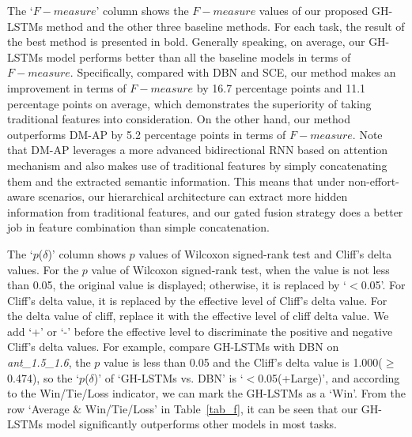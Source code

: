 \documentclass[journal]{IEEEtran}
\begin{document}
The `$F-measure$' column shows the $F-measure$ values of our proposed GH-LSTMs method and the other three baseline methods. For each task, the result of the best method is presented in bold. Generally speaking, on average, our GH-LSTMs model performs better than all the baseline models in terms of $F-measure$. Specifically, compared with DBN and SCE, our method makes an improvement in terms of $F-measure$ by 16.7 percentage points and 11.1 percentage points on average, which demonstrates the superiority of taking traditional features into consideration. On the other hand, our method outperforms DM-AP by 5.2 percentage points in terms of $F-measure$. Note that DM-AP leverages a more advanced bidirectional RNN based on attention mechanism and also makes use of traditional features by simply concatenating them and the extracted semantic information. This means that under non-effort-aware scenarios, our hierarchical architecture can extract more hidden information from traditional features, and our gated fusion strategy does a better job in feature combination than simple concatenation.


The `$p$($\delta$)' column shows $p$ values of Wilcoxon signed-rank test and Cliff's delta values. For the $p$ value of Wilcoxon signed-rank test, when the value is not less than 0.05, the original value is displayed; otherwise, it is replaced by `$<$0.05'. For Cliff's delta value, it is replaced by the effective level of Cliff's delta value. For the delta value of cliff, replace it with the effective level of cliff delta value. We add `+' or `-' before the effective level to discriminate the positive and negative Cliff's delta values. For example, compare GH-LSTMs with DBN on \textit{ant\_1.5\_1.6}, the $p$ value is less than 0.05 and the Cliff's delta value is 1.000($\geq$0.474), so the `$p$($\delta$)' of `GH-LSTMs vs. DBN' is `$<$0.05(+Large)', and according to the Win/Tie/Loss indicator, we can mark the GH-LSTMs as a `Win'. From the row `Average $\&$ Win/Tie/Loss' in Table~\ref{tab_f}, it can be seen that our GH-LSTMs model significantly outperforms other models in most tasks.
\end{document}
